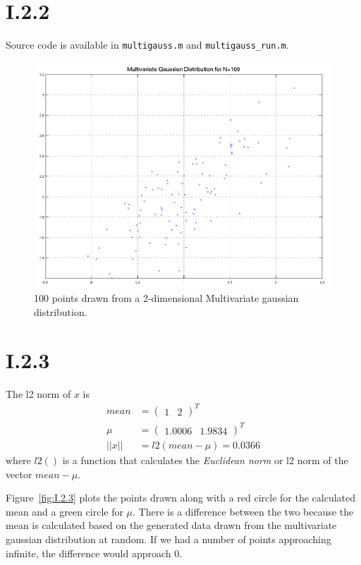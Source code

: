 \section*{I.2.2}
Source code is available in \texttt{multigauss.m} and \texttt{multigauss\_run.m}.
\begin{figure}[h!]
	\includegraphics[width=\textwidth]{img/multigauss}
	\caption{100 points drawn from a 2-dimensional Multivariate gaussian
          distribution. \label{fig:I.2.2}}
\end{figure}

\section*{I.2.3}
The l2 norm of $x$ is
\begin{align*}
	mean  &= \begin{pmatrix}1 & 2\end{pmatrix}^T \\
	\mu   &= \begin{pmatrix}1.0006 & 1.9834\end{pmatrix}^T \\
	||x|| &= l2(mean - \mu) = 0.0366
\end{align*}
where $l2()$ is a function that calculates the \textit{Euclidean norm} or l2
norm of the vector $mean - \mu$.

Figure~\ref{fig:I.2.3} plots the points drawn along with a red circle for the
calculated mean and a green circle for $\mu$. There is a difference between the
two because the mean is calculated based on the generated data drawn from the
multivariate gaussian distribution at random. If we had a number of points
approaching infinite, the difference would approach 0.

